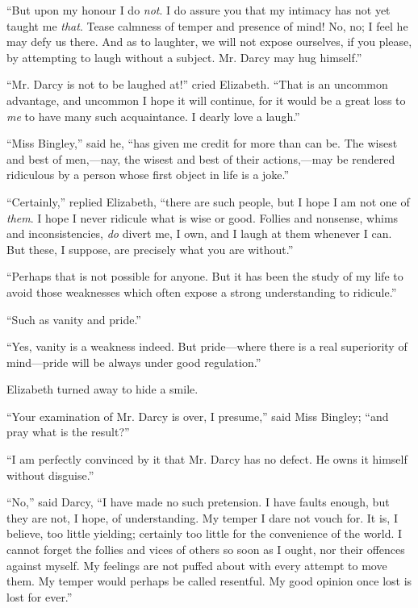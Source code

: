 \documentclass[12pt,openright]{book}
\begin{document}
“But upon my honour I do \textit{not}. I do assure you that my intimacy has not yet taught me \textit{that}. Tease calmness of temper and presence of mind! No, no; I feel he may defy us there. And as to laughter, we will not expose ourselves, if you please, by attempting to laugh without a subject. Mr. Darcy may hug himself.”

“Mr. Darcy is not to be laughed at!” cried Elizabeth. “That is an uncommon advantage, and uncommon I hope it will continue, for it would be a great loss to \textit{me} to have many such acquaintance. I dearly love a laugh.”

“Miss Bingley,” said he, “has given me credit for more than can be. The wisest and best of men,—nay, the wisest and best of their actions,—may be rendered ridiculous by a person whose first object in life is a joke.”

“Certainly,” replied Elizabeth, “there are such people, but I hope I am not one of \textit{them}. I hope I never ridicule what is wise or good. Follies and nonsense, whims and inconsistencies, \textit{do} divert me, I own, and I laugh at them whenever I can. But these, I suppose, are precisely what you are without.”

“Perhaps that is not possible for anyone. But it has been the study of my life to avoid those weaknesses which often expose a strong understanding to ridicule.”

“Such as vanity and pride.”

“Yes, vanity is a weakness indeed. But pride—where there is a real superiority of mind—pride will be always under good regulation.”

Elizabeth turned away to hide a smile.

“Your examination of Mr. Darcy is over, I presume,” said Miss Bingley; “and pray what is the result?”

“I am perfectly convinced by it that Mr. Darcy has no defect. He owns it himself without disguise.”

“No,” said Darcy, “I have made no such pretension. I have faults enough, but they are not, I hope, of understanding. My temper I dare not vouch for. It is, I believe, too little yielding; certainly too little for the convenience of the world. I cannot forget the follies and vices of others so soon as I ought, nor their offences against myself. My feelings are not puffed about with every attempt to move them. My temper would perhaps be called resentful. My good opinion once lost is lost for ever.”
\end{document}
